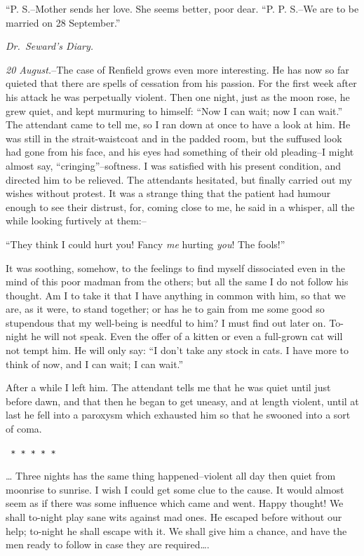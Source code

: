 \documentclass[12pt,openright]{book}
\begin{document}
“P. S.–Mother sends her love. She seems better, poor dear. “P. P. S.–We are to be married on 28 September.”

\textit{Dr. Seward’s Diary.}

\textit{20 August.}–The case of Renfield grows even more interesting. He has now so far quieted that there are spells of cessation from his passion. For the first week after his attack he was perpetually violent. Then one night, just as the moon rose, he grew quiet, and kept murmuring to himself: “Now I can wait; now I can wait.” The attendant came to tell me, so I ran down at once to have a look at him. He was still in the strait-waistcoat and in the padded room, but the suffused look had gone from his face, and his eyes had something of their old pleading–I might almost say, “cringing”–softness. I was satisfied with his present condition, and directed him to be relieved. The attendants hesitated, but finally carried out my wishes without protest. It was a strange thing that the patient had humour enough to see their distrust, for, coming close to me, he said in a whisper, all the while looking furtively at them:–

“They think I could hurt you! Fancy \textit{me} hurting \textit{you}! The fools!”

It was soothing, somehow, to the feelings to find myself dissociated even in the mind of this poor madman from the others; but all the same I do not follow his thought. Am I to take it that I have anything in common with him, so that we are, as it were, to stand together; or has he to gain from me some good so stupendous that my well-being is needful to him? I must find out later on. To-night he will not speak. Even the offer of a kitten or even a full-grown cat will not tempt him. He will only say: “I don’t take any stock in cats. I have more to think of now, and I can wait; I can wait.”

After a while I left him. The attendant tells me that he was quiet until just before dawn, and that then he began to get uneasy, and at length violent, until at last he fell into a paroxysm which exhausted him so that he swooned into a sort of coma.

\texttt{   *       *       *       *       *}

… Three nights has the same thing happened–violent all day then quiet from moonrise to sunrise. I wish I could get some clue to the cause. It would almost seem as if there was some influence which came and went. Happy thought! We shall to-night play sane wits against mad ones. He escaped before without our help; to-night he shall escape with it. We shall give him a chance, and have the men ready to follow in case they are required….
\end{document}
